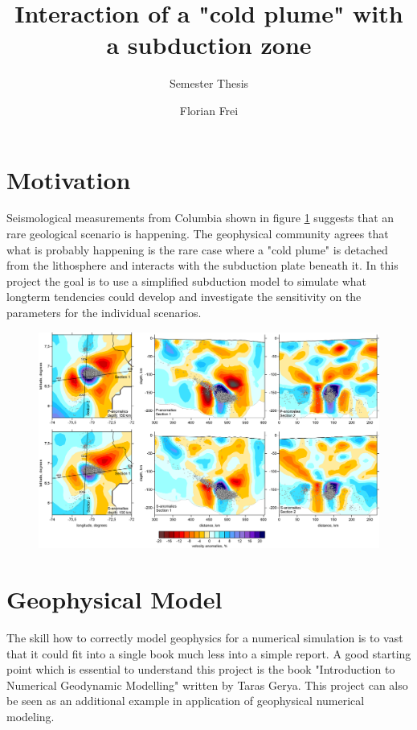 \documentclass[12pt]{scrreprt}
\begin{document}
\title{Interaction of a "cold plume" with a subduction zone}
\subtitle{Semester Thesis}
\author{Florian Frei}

\maketitle

\newpage

\tableofcontents

\newpage

\section{Motivation}
Seismological measurements from Columbia shown in figure \ref{fig:seism_data} suggests that an rare geological scenario is happening. The geophysical community agrees that what is probably happening is the rare case where a "cold plume" is detached from the lithosphere and interacts with the subduction plate beneath it. In this project the goal is to use a simplified subduction model to simulate what longterm tendencies could develop and investigate the sensitivity on the parameters for the individual scenarios.
\begin{figure}
\includegraphics[scale=0.45]{deep_anomaly_hor_ver.png}
\label{fig:seism_data}
\end{figure}

\section{Geophysical Model}

The skill how to correctly model geophysics for a numerical simulation is to vast that it could fit into a single book much less into a simple report. A good starting point which is essential to understand this project is the book "Introduction to Numerical Geodynamic Modelling" \cite{gerya2009introduction} written by Taras Gerya. This project can also be seen as an additional example in application of geophysical numerical modeling.
\end{document}
